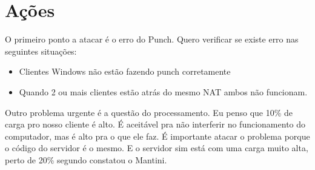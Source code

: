 \documentclass[12pt]{article}
\begin{document}
\section{Ações}

O primeiro ponto a atacar é o erro do Punch. Quero verificar se existe erro nas seguintes situações:
\begin{itemize}
\item Clientes Windows não estão fazendo punch corretamente
\item Quando 2 ou mais clientes estão atrás do mesmo NAT ambos não funcionam.
\end{itemize}

Outro problema urgente é a questão do processamento. Eu penso que 10\% de carga pro nosso
cliente é alto. É aceitável pra não interferir no funcionamento do computador, mas é alto
pra o que ele faz. É importante atacar o problema porque o código do servidor é o mesmo.
E o servidor sim está com uma carga muito alta, perto de 20\% segundo constatou o Mantini.
\end{document}
